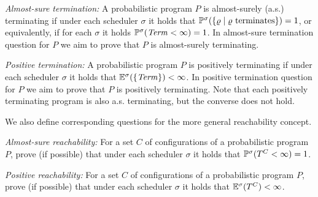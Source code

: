 \begin{compactenum}
\item \emph{Almost-sure termination:} A probabilistic program $P$ is 
almost-surely (a.s.) 
terminating if under each scheduler $\sigma$ it holds that 
$\mathbb{P}^{\sigma}(\{\varrho\mid \varrho \text{ terminates}\}) = 1$, or equivalently, 
if for each $\sigma$ it holds $\mathbb{P}^{\sigma}(\mathit{Term}<\infty)=1$. In 
almost-sure termination question for $P$ we aim to prove that $P$ 
is 
almost-surely terminating.
\item \emph{Positive termination:} A probabilistic program $P$ is 
positively
terminating if under each scheduler $\sigma$ it holds that 
$\mathbb{E}^{\sigma}(\{\mathit{Term}\})<  \infty$. In 
positive termination question for $P$ we aim to prove that $P$ 
is 
positively terminating. Note that each positively terminating program is also 
a.s. terminating, but the converse does not hold.
\end{compactenum}

We also define corresponding questions for the more general reachability 
concept. 
 
\begin{compactenum}
\item \emph{Almost-sure reachability:} For a set $C$ of configurations of a
probabilistic program $P$, prove (if possible) that under each scheduler 
$\sigma$ it holds that
$\mathbb{P}^{\sigma}(T^{C}<\infty)=1$.
\item \emph{Positive reachability:} For a set $C$ of configurations of 
a probabilistic program $P$, prove (if possible) that under each scheduler 
$\sigma$ it holds that
$\mathbb{E}^{\sigma}(T^{C})<\infty$.
\end{compactenum}

